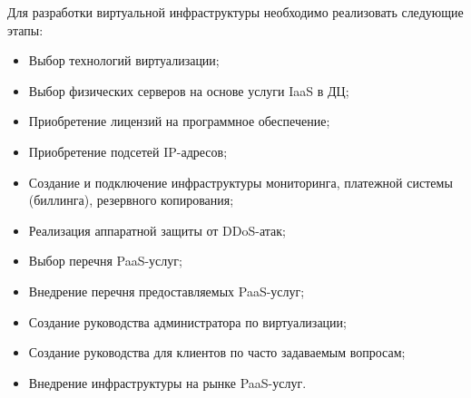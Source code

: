 Для разработки виртуальной инфраструктуры необходимо реализовать следующие этапы:
\begin{itemize}
    \item Выбор технологий виртуализации;
    \item Выбор физических серверов на основе услуги IaaS в ДЦ;
    \item Приобретение лицензий на программное обеспечение;
    \item Приобретение подсетей IP-адресов;
    \item Создание и подключение инфраструктуры мониторинга, платежной системы (биллинга), резервного копирования;
    \item Реализация аппаратной защиты от DDoS-атак;
    \item Выбор перечня PaaS-услуг;
    \item Внедрение перечня предоставляемых PaaS-услуг;
    \item Создание руководства администратора по виртуализации;
    \item Создание руководства для клиентов по часто задаваемым вопросам;
    \item Внедрение инфраструктуры на рынке PaaS-услуг.
\end{itemize}

\clearpage
